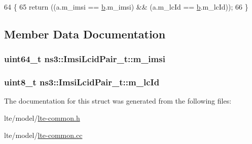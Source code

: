 \begin{DoxyCode}
64 \{
65   \textcolor{keywordflow}{return} ((a.m\_imsi == \hyperlink{buildings__pathloss_8m_a21ad0bd836b90d08f4cf640b4c298e7c}{b}.m\_imsi) && (a.m\_lcId == \hyperlink{buildings__pathloss_8m_a21ad0bd836b90d08f4cf640b4c298e7c}{b}.m\_lcId));
66 \}
\end{DoxyCode}


\subsection{Member Data Documentation}
\subsubsection[{\texorpdfstring{m\+\_\+imsi}{m_imsi}}]{\setlength{\rightskip}{0pt plus 5cm}uint64\+\_\+t ns3\+::\+Imsi\+Lcid\+Pair\+\_\+t\+::m\+\_\+imsi}\hypertarget{structns3_1_1ImsiLcidPair__t_ab8d6610383414991afa8b3acf0149f51}{}\label{structns3_1_1ImsiLcidPair__t_ab8d6610383414991afa8b3acf0149f51}
\subsubsection[{\texorpdfstring{m\+\_\+lc\+Id}{m_lcId}}]{\setlength{\rightskip}{0pt plus 5cm}uint8\+\_\+t ns3\+::\+Imsi\+Lcid\+Pair\+\_\+t\+::m\+\_\+lc\+Id}\hypertarget{structns3_1_1ImsiLcidPair__t_a3c5c9627f5aa57d05aabf8dd3ab170d0}{}\label{structns3_1_1ImsiLcidPair__t_a3c5c9627f5aa57d05aabf8dd3ab170d0}


The documentation for this struct was generated from the following files\+:\begin{DoxyCompactItemize}
\item 
lte/model/\hyperlink{lte-common_8h}{lte-\/common.\+h}\item 
lte/model/\hyperlink{lte-common_8cc}{lte-\/common.\+cc}\end{DoxyCompactItemize}
